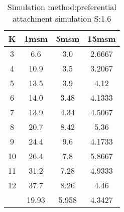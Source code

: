 \begin{table}[H]
\centering
\begin{tabular}{c|ccc}
K &1msm &5msm &15msm\\
\hline
3 & 6.6 & 3.0 & 2.6667\\
4 & 10.9 & 3.5 & 3.2067\\
5 & 13.5 & 3.9 & 4.12\\
6 & 14.0 & 3.48 & 4.1333\\
7 & 13.9 & 4.34 & 4.5067\\
8 & 20.7 & 8.42 & 5.36\\
9 & 24.4 & 9.6 & 4.1733\\
10 & 26.4 & 7.8 & 5.8667\\
11 & 31.2 & 7.28 & 4.9333\\
12 & 37.7 & 8.26 & 4.46\\
\hline
& 19.93 & 5.958 & 4.3427\\
\end{tabular}
\caption{Simulation method:preferential attachment simulation S:1.6}
\label{tab:s1.6}
\end{table}
